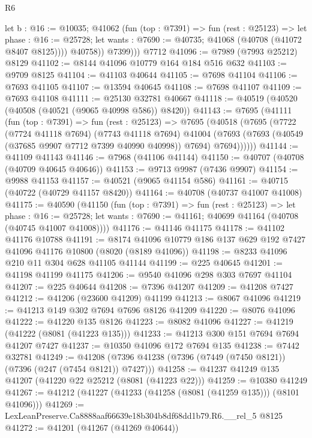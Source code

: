 \begin{lexlean}{R6}
\begin{coremodule}
            let b : @16 := @10035;
            @41062
              (fun (top : @7391) =>
              fun (rest : @25123) =>
              let phase : @16 := @25728;
              let wants : @7690 := @40735; @41068 (@40708 (@41072 @8407 @8125))))
            @40758))
          @7399)))
    @7712
@41096 := @7989 (@7993 @25212) @8129
@41102 := @8144 @41096 @10779 @164 @184 @516 @632
@41103 := @9709 @8125
@41104 := @41103 @40644
@41105 := @7698 @41104
@41106 := @7693 @41105
@41107 := @13594 @40645
@41108 := @7698 @41107
@41109 := @7693 @41108
@41111 := @25130 @32781 @40667
@41118 := @40519 (@40520 (@40508 (@40521 (@9065 @40998 @586)) @8420))
@41143 := @7695
    (@41111
      (fun (top : @7391) =>
      fun (rest : @25123) =>
      @7695
        (@40518
          (@7695
            (@7722
              (@7724 @41118 @7694)
              (@7743 @41118 @7694)
              @41004
              (@7693 (@7693 (@40549 (@37685 @9907 @7712 @7399 @40990 @40998)) @7694) @7694))))))
@41144 := @41109 @41143
@41146 := @7968 (@41106 @41144)
@41150 := @40707 (@40708 (@40709 @40645 @40646))
@41153 := @9713 @9987 (@7436 @9907)
@41154 := @9988 @41153
@41157 := @40521 (@9065 @41154 @586)
@41161 := @40715 (@40722 (@40729 @41157 @8420))
@41164 := @40708 (@40737 @41007 @41008)
@41175 := @40590
    (@41150
      (fun (top : @7391) =>
      fun (rest : @25123) =>
      let phase : @16 := @25728;
      let wants : @7690 := @41161; @40699 @41164 (@40708 (@40745 @41007 @41008))))
@41176 := @41146 @41175
@41178 := @41102 @41176 @10788
@41191 := @8174 @41096 @10779 @186 @137 @629 @192 @7427 @41096 @41176 @10800 (@8020 (@8189 @41096))
@41198 := @8233 @41096 @210 @11 @304 @628 @41105 @41144
@41199 := @225 @40645
@41201 := @41198 @41199 @41175
@41206 := @9540 @41096 @298 @303 @7697 @41104
@41207 := @225 @40644
@41208 := @7396 @41207
@41209 := @41208 @7427
@41212 := @41206 (@23600 @41209) @41199
@41213 := @8067 @41096
@41219 := @41213 @149 @302 @7694 @7696 @8126 @41209
@41220 := @8076 @41096
@41222 := @41220 @135 @8126
@41223 := @8082 @41096
@41227 := @41219 (@41222 (@8081 (@41223 @135)))
@41233 := @41213 @300 @151 @7694 @7694 @41207 @7427
@41237 := @10350 @41096 @172 @7694 @135
@41238 := @7442 @32781
@41249 := @41208 (@7396 @41238 (@7396 (@7449 (@7450 @8121)) (@7396 (@247 (@7454 @8121)) @7427)))
@41258 := @41237 @41249 @135 @41207 (@41220 @22 @25212 (@8081 (@41223 @22)))
@41259 := @10380 @41249
@41267 := @41212 (@41227 (@41233 (@41258 (@8081 (@41259 @135))) (@8101 @41096)))
@41269 := LexLeanPreserve.Ca8888aaf66639e18b304b8df68dd1b79.R6.__rel_5 @8125
@41272 := @41201 (@41267 (@41269 @40644))

\end{coremodule}
\end{lexlean}
